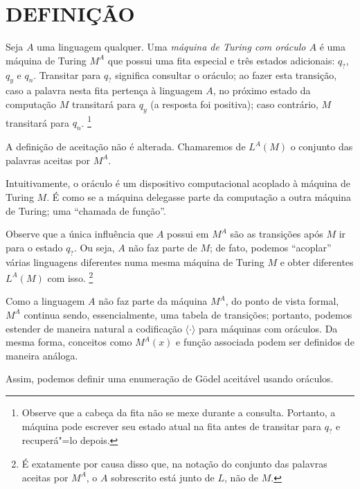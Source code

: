 \section{DEFINIÇÃO}
\label{sec:oracle_definition}

\begin{definition}
    Seja $A$ uma linguagem qualquer.
    Uma \emph{máquina de Turing com oráculo $A$}
    é uma máquina de Turing $M^A$ que possui uma fita especial
    e três estados adicionais: $q_?$, $q_y$ e $q_n$.
    Transitar para $q_?$ significa consultar o oráculo;
    ao fazer esta transição,
    caso a palavra nesta fita pertença à linguagem $A$,
    no próximo estado da computação $M$ transitará para $q_y$
    (a resposta foi positiva);
    caso contrário, $M$ transitará para $q_n$.%
    \footnote{
        Observe que a cabeça da fita não se mexe durante a consulta.
        Portanto, a máquina pode escrever seu estado atual na fita
        antes de transitar para $q_?$ e recuperá"=lo depois.
    }

    A definição de aceitação não é alterada.
    Chamaremos de $L^A(M)$ o conjunto das palavras aceitas por $M^A$.
\end{definition}

Intuitivamente, o oráculo é um dispositivo computacional
acoplado à máquina de Turing $M$.
É como se a máquina delegasse parte da computação
a outra máquina de Turing;
uma ``chamada de função''.

Observe que a única influência que $A$ possui em $M^A$
são as transições após $M$ ir para o estado $q_?$.
Ou seja, $A$ não faz parte de $M$;
de fato, podemos ``acoplar'' várias linguagens diferentes
numa mesma máquina de Turing $M$
e obter diferentes $L^A(M)$ com isso.%
\footnote{
    É exatamente por causa disso que,
    na notação do conjunto das palavras aceitas por $M^A$,
    o $A$ sobrescrito está junto de $L$, não de $M$.
}

Como a linguagem $A$ não faz parte da máquina $M^A$,
do ponto de vista formal,
$M^A$ continua sendo, essencialmente,
uma tabela de transições;
portanto,
podemos estender de maneira natural a codificação $\langle \cdot \rangle$
para máquinas com oráculos.
Da mesma forma, conceitos como $M^A(x)$ e função associada
podem ser definidos de maneira análoga.

Assim,
podemos definir uma enumeração de Gödel aceitável usando oráculos.

